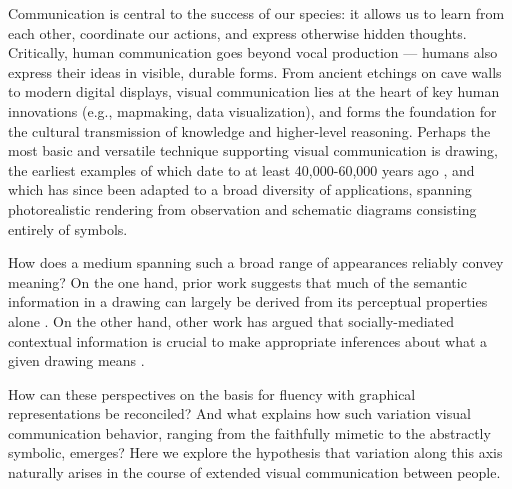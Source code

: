 \documentclass[10pt,letterpaper]{article}
\begin{document}
Communication is central to the success of our species: it allows us to learn from each other, coordinate our actions, and express otherwise hidden thoughts. 
Critically, human communication goes beyond vocal production --- humans also express their ideas in visible, durable forms. 
From ancient etchings on cave walls to modern digital displays, visual communication lies at the heart of key human innovations (e.g., mapmaking, data visualization), and forms the foundation for the cultural transmission of knowledge and higher-level reasoning. 
Perhaps the most basic and versatile technique supporting visual communication is drawing, the earliest examples of which date to at least 40,000-60,000 years ago \cite{hoffmann2018u,Aubert:2014jy}, and which has since been adapted to a broad diversity of applications, spanning photorealistic rendering from observation and schematic diagrams consisting entirely of symbols. 

How does a medium spanning such a broad range of appearances reliably convey meaning? 
On the one hand, prior work suggests that much of the semantic information in a drawing can largely be derived from its perceptual properties alone \cite{FanCommon2018,sayim2011line}. 
On the other hand, other work has argued that socially-mediated contextual information is crucial to make appropriate inferences about what a given drawing means \cite{goodman1976languages,gombrich1969art}.

How can these perspectives on the basis for fluency with graphical representations be reconciled? 
And what explains how such variation visual communication behavior, ranging from the faithfully mimetic to the abstractly symbolic, emerges? 
Here we explore the hypothesis that variation along this axis naturally arises in the course of extended visual communication between people. 


\end{document}
